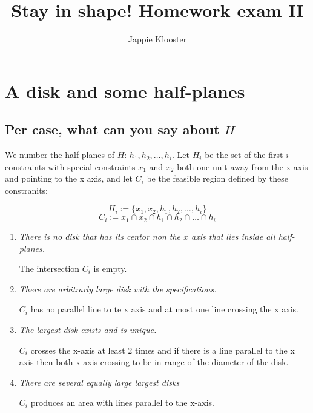 \documentclass{article}
\begin{document}
\author{Jappie Klooster}
\title{Stay in shape! Homework exam II}
\maketitle
\section{A disk and some half-planes}
\subsection{Per case, what can you say about $H$}
We number the half-planes of $H$: $h_1, h_2,\dots,h_i$.
Let $H_{i}$ be the set of the first $i$ constraints with special constraints
$x_1$ and $x_2$ both one unit away from the x axis and pointing to the x
axis, and
let $C_{i}$ be the feasible region defined by these constranits:

\[ H_i := \{x_1, x_2, h_1, h_2,\dots, h_i\}\]
\[ C_i := x_1 \cap x_2 \cap h_1 \cap h_2 \cap \dots \cap h_i\]

\begin{enumerate}[i]
	\item \emph{There is no disk that has its centor non the $x$ axis
			that lies inside all half-planes.}

	The intersection $C_i$ is empty.

	\item \emph{There are arbitrarly large disk with the specifications.}

		$C_i$ has no parallel line  to te x axis and
		at most one line crossing the x axis.

	\item \emph{The largest disk exists and is unique.}

		$C_i$ crosses the x-axis at least 2 times and
		if there is a line parallel to the x axis then both x-axis crossing
		to be in range of the diameter of the disk.

	\item \emph{There are several equally large largest disks}

		$C_i$ produces an area with lines parallel to the x-axis.

\end{enumerate}

\newpage
\end{document}
